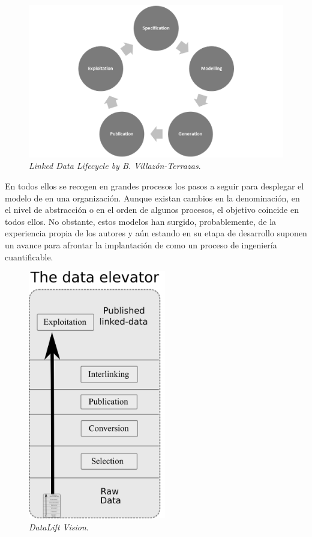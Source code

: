 \begin{figure}[!htb]
\centering
	\includegraphics[width=14cm]{images/phd/Villazon-terrazas}
\caption{\textit{Linked Data Lifecycle by B. Villazón-Terrazas}.}
\label{fig:boris}
\end{figure}

En todos ellos se recogen en grandes procesos los pasos a seguir para desplegar el modelo de \linkeddata en una organización. Aunque
existan cambios en la denominación, en el nivel de abstracción o en el orden de algunos procesos, el objetivo coincide en todos ellos. No obstante, estos modelos han surgido, probablemente,
de la experiencia propia de los autores y aún estando en su etapa de desarrollo suponen un avance para afrontar la implantación
de \linkeddata como un proceso de ingeniería cuantificable.

\begin{figure}[!htb]
\centering
	\includegraphics[width=6cm]{images/phd/Data_elevator}
\caption{\textit{DataLift Vision}.}
\label{fig:datalift}
\end{figure}

